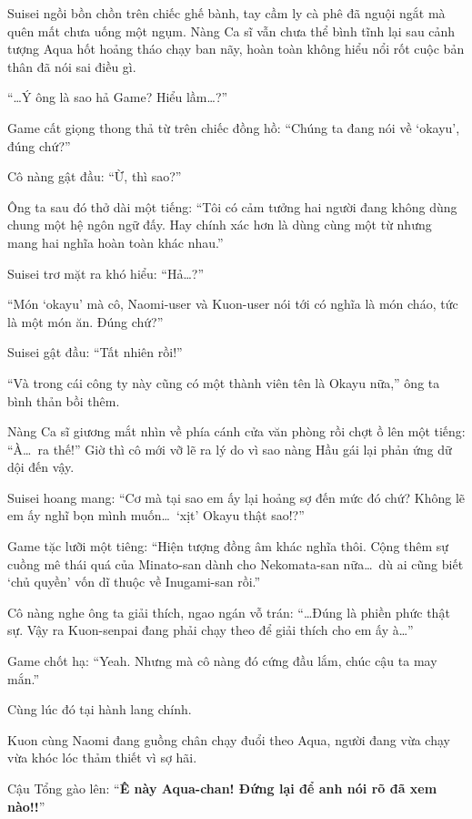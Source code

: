 \documentclass[../main.tex]{subfiles}
\begin{document}
Suisei ngồi bồn chồn trên chiếc ghế bành, tay cầm ly cà phê đã nguội ngắt mà quên mất chưa uống một ngụm. Nàng Ca sĩ vẫn chưa thể bình tĩnh lại sau cảnh tượng Aqua hốt hoảng tháo chạy ban nãy, hoàn toàn không hiểu nổi rốt cuộc bản thân đã nói sai điều gì.

``\dots Ý ông là sao hả Game? Hiểu lầm\dots?''

Game cất giọng thong thả từ trên chiếc đồng hồ: ``Chúng ta đang nói về `okayu', đúng chứ?''

Cô nàng gật đầu: ``Ừ, thì sao?''

Ông ta sau đó thở dài một tiếng: ``Tôi có cảm tưởng hai người đang không dùng chung một hệ ngôn ngữ đấy. Hay chính xác hơn là dùng cùng một từ nhưng mang hai nghĩa hoàn toàn khác nhau.''

Suisei trơ mặt ra khó hiểu: ``Hả\dots?''

``Món `okayu' mà cô, Naomi-user và Kuon-user nói tới có nghĩa là món cháo, tức là một món ăn. Đúng chứ?''

Suisei gật đầu: ``Tất nhiên rồi!''

``Và trong cái công ty này cũng có một thành viên tên là Okayu nữa,'' ông ta bình thản bồi thêm.

Nàng Ca sĩ giương mắt nhìn về phía cánh cửa văn phòng rồi chợt ồ lên một tiếng: ``À\dots\ ra thế!'' Giờ thì cô mới vỡ lẽ ra lý do vì sao nàng Hầu gái lại phản ứng dữ dội đến vậy.

Suisei hoang mang: ``Cơ mà tại sao em ấy lại hoảng sợ đến mức đó chứ? Không lẽ em ấy nghĩ bọn mình muốn\dots\ `xịt' Okayu thật sao!?''

Game tặc lưỡi một tiêng: ``Hiện tượng đồng âm khác nghĩa thôi. Cộng thêm sự cuồng mê thái quá của Minato-san dành cho Nekomata-san nữa\dots\ dù ai cũng biết `chủ quyền' vốn dĩ thuộc về Inugami-san rồi.''

Cô nàng nghe ông ta giải thích, ngao ngán vỗ trán: ``\dots Đúng là phiền phức thật sự. Vậy ra Kuon-senpai đang phải chạy theo để giải thích cho em ấy à\dots''

Game chốt hạ: ``Yeah. Nhưng mà cô nàng đó cứng đầu lắm, chúc cậu ta may mắn.''

\ct

Cùng lúc đó tại hành lang chính.

Kuon cùng Naomi đang guồng chân chạy đuổi theo Aqua, người đang vừa chạy vừa khóc lóc thảm thiết vì sợ hãi.

Cậu Tổng gào lên: ``\textbf{Ê này Aqua-chan! Đứng lại để anh nói rõ đã xem nào!!}''
\end{document}
